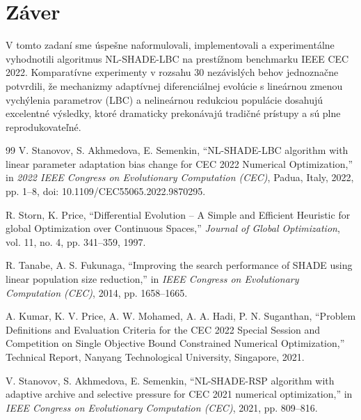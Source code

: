 \documentclass[11pt,a4paper]{article}
\begin{document}
\section{Záver}
V tomto zadaní sme úspešne naformulovali, implementovali a experimentálne vyhodnotili algoritmus NL-SHADE-LBC na prestížnom benchmarku IEEE CEC 2022. Komparatívne experimenty v rozsahu 30 nezávislých behov jednoznačne potvrdili, že mechanizmy adaptívnej diferenciálnej evolúcie s lineárnou zmenou vychýlenia parametrov (LBC) a nelineárnou redukciou populácie dosahujú excelentné výsledky, ktoré dramaticky prekonávajú tradičné prístupy a sú plne reprodukovateľné.

\begin{thebibliography}{99}
V. Stanovov, S. Akhmedova, E. Semenkin, ``NL-SHADE-LBC algorithm with linear parameter adaptation bias change for CEC 2022 Numerical Optimization,'' in \textit{2022 IEEE Congress on Evolutionary Computation (CEC)}, Padua, Italy, 2022, pp. 1--8, doi: 10.1109/CEC55065.2022.9870295.

R. Storn, K. Price, ``Differential Evolution -- A Simple and Efficient Heuristic for global Optimization over Continuous Spaces,'' \textit{Journal of Global Optimization}, vol. 11, no. 4, pp. 341--359, 1997.

R. Tanabe, A. S. Fukunaga, ``Improving the search performance of SHADE using linear population size reduction,'' in \textit{IEEE Congress on Evolutionary Computation (CEC)}, 2014, pp. 1658--1665.

A. Kumar, K. V. Price, A. W. Mohamed, A. A. Hadi, P. N. Suganthan, ``Problem Definitions and Evaluation Criteria for the CEC 2022 Special Session and Competition on Single Objective Bound Constrained Numerical Optimization,'' Technical Report, Nanyang Technological University, Singapore, 2021.

V. Stanovov, S. Akhmedova, E. Semenkin, ``NL-SHADE-RSP algorithm with adaptive archive and selective pressure for CEC 2021 numerical optimization,'' in \textit{IEEE Congress on Evolutionary Computation (CEC)}, 2021, pp. 809--816.
\end{thebibliography}
\end{document}
